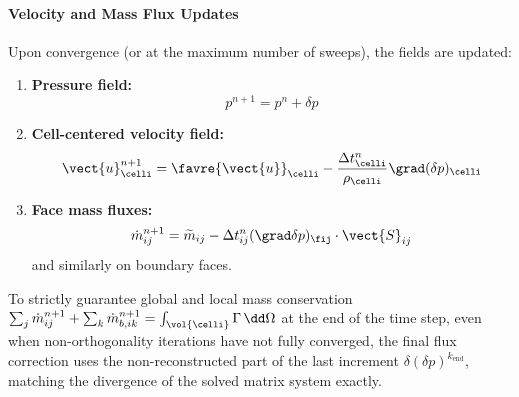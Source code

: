 \paragraph{Velocity and Mass Flux Updates}
Upon convergence (or at the maximum number of sweeps), the fields are updated:
\begin{enumerate}
\item \textbf{Pressure field:}
  \begin{equation}
    p^{n+1} = p^n + \delta p
  \end{equation}
\item \textbf{Cell-centered velocity field:}
  \begin{equation}
    \vect{u}_\celli^{n+1} = \favre{\vect{u}}_\celli - \frac{\Delta t_\celli^n}{\rho_\celli} \grad(\delta p)_\celli
  \end{equation}
\item \textbf{Face mass fluxes:}
  \begin{equation}
    \dot{m}_{ij}^{n+1} = \widetilde{m}_{ij} - \Delta t_{ij}^n (\grad \delta p)_{\fij} \cdot \vect{S}_{ij}
  \end{equation}
  and similarly on boundary faces.
\end{enumerate}

To strictly guarantee global and local mass conservation $\sum_j \dot{m}_{ij}^{n+1} + \sum_k \dot{m}_{b,ik}^{n+1} = \int_{\vol{\celli}} \Gamma \, \dd \Omega$
at the end of the time step, even when non-orthogonality iterations have not fully
converged, the final flux correction uses the non-reconstructed part of the last
increment $\delta(\delta p)^{k_{\text{end}}}$, matching the divergence of the
solved matrix system exactly.
